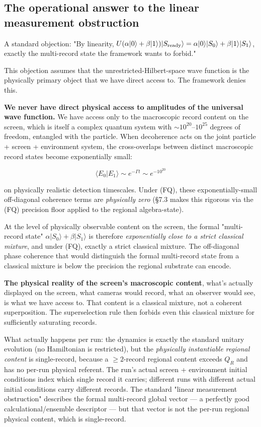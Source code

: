 \documentclass[11pt,a4paper]{article}
\begin{document}
\subsection{The operational answer to the linear measurement obstruction}

A standard objection: "By linearity, $U(\alpha|0\rangle + \beta|1\rangle)|S_{\rm ready}\rangle = \alpha|0\rangle|S_0\rangle + \beta|1\rangle|S_1\rangle$, exactly the multi-record state the framework wants to forbid."

This objection assumes that the unrestricted-Hilbert-space wave function is the physically primary object that we have direct access to. The framework denies this.

\textbf{We never have direct physical access to amplitudes of the universal wave function.} We have access only to the macroscopic record content on the screen, which is itself a complex quantum system with $\sim 10^{20}$–$10^{25}$ degrees of freedom, entangled with the particle. When decoherence acts on the joint particle + screen + environment system, the cross-overlaps between distinct macroscopic record states become exponentially small:

\[
\langle E_0 | E_1 \rangle \sim e^{-\Gamma t} \sim e^{-10^{20}}
\]

on physically realistic detection timescales. Under (FQ), these exponentially-small off-diagonal coherence terms are \emph{physically zero} (§7.3 makes this rigorous via the (FQ) precision floor applied to the regional algebra-state).

At the level of physically observable content on the screen, the formal "multi-record state" $\alpha|S_0\rangle + \beta|S_1\rangle$ is therefore \emph{exponentially close to a strict classical mixture}, and under (FQ), exactly a strict classical mixture. The off-diagonal phase coherence that would distinguish the formal multi-record state from a classical mixture is below the precision the regional substrate can encode.

\textbf{The physical reality of the screen's macroscopic content}, what's actually displayed on the screen, what cameras would record, what an observer would see, is what we have access to. That content is a classical mixture, not a coherent superposition. The superselection rule then forbids even this classical mixture for sufficiently saturating records.

What actually happens per run: the dynamics is exactly the standard unitary evolution (no Hamiltonian is restricted), but the \emph{physically instantiable regional content} is single-record, because a $\ge 2$-record regional content exceeds $Q_R$ and has no per-run physical referent. The run's actual screen + environment initial conditions index which single record it carries; different runs with different actual initial conditions carry different records. The standard "linear measurement obstruction" describes the formal multi-record global vector — a perfectly good calculational/ensemble descriptor — but that vector is not the per-run regional physical content, which is single-record.
\end{document}
